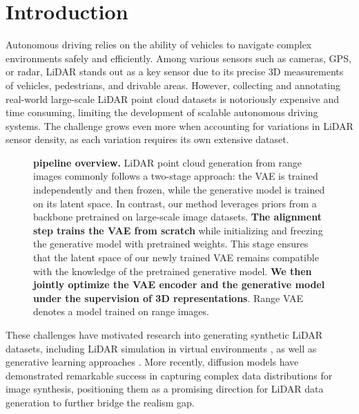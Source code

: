  \section{Introduction}
\label{sec:intro}


Autonomous driving relies on the ability of vehicles to navigate complex environments safely and efficiently. Among various sensors such as cameras, GPS, or radar, LiDAR stands out as a key sensor due to its precise 3D measurements of vehicles, pedestrians, and drivable areas. 
However, collecting and annotating real-world  large-scale LiDAR point cloud datasets is notoriously expensive and time consuming, limiting the development of scalable autonomous driving systems. The challenge grows even more when accounting for variations in LiDAR sensor density, as each variation requires its own extensive dataset.

\begin{figure}[!htb]
    \centering
    \begingroup
    \footnotesize
    \def\svgwidth{\columnwidth} %
    
    \endgroup
    \caption{\textbf{\ours pipeline overview.} LiDAR point cloud generation from range images commonly follows a two-stage approach: the VAE is trained independently and then frozen, while the generative model is trained on its latent space. In contrast, our method leverages priors from a backbone pretrained on large-scale image datasets. \textbf{The alignment step trains the VAE from scratch} while initializing and freezing the generative model with pretrained weights. 
    This stage ensures that the latent space of our newly trained VAE remains compatible with the knowledge of the pretrained generative model.
    \textbf{We then jointly optimize the VAE encoder and the generative model under the supervision of 3D representations}. Range VAE denotes a model trained on range images.}
    \label{fig:tuning}
\end{figure}

These challenges have motivated research into generating synthetic LiDAR datasets, including LiDAR simulation in virtual environments \cite{gschwandtner2011blensor, fang2020augmentedLiDAR, fang2021LiDARaug, yue2018LiDARpcgen}, as well as generative learning approaches \cite{zyrianov2022learning} \cite{xiong_ultralidar_2023}. More recently, diffusion models have demonstrated remarkable success in capturing complex data distributions for image synthesis, positioning them as a promising direction for LiDAR data generation to further bridge the realism gap.


